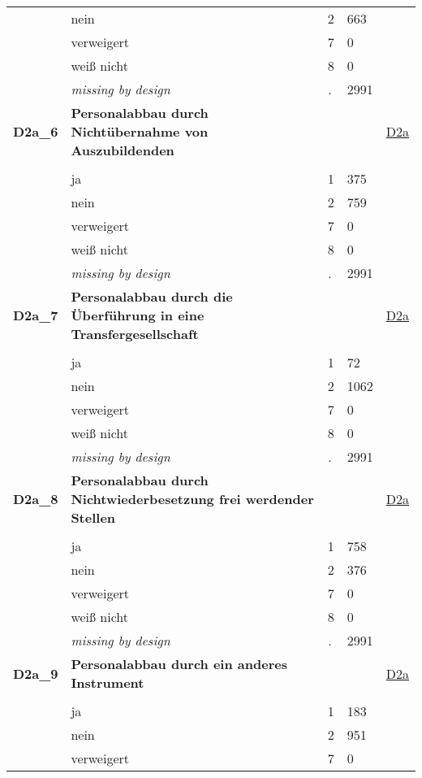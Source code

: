 \begin{longtable}{| L{2.65cm} | L{8cm} | C{1.5cm} | R{1.25cm} | C{2.25cm}  |}
   & nein & 2 & 663 &  \\ 
   & verweigert & 7 & 0 &  \\ 
   & weiß nicht & 8 & 0 &  \\ 
   & \textit{missing by design} & \textit{.} & 2991 &  \\ 
   \midrule
\textbf{D2a\_6}\label{var:D2a:6} & \textbf{Personalabbau durch Nichtübernahme von Auszubildenden} &  &  & \hyperref[D2a]{D2a} \\ 
   &  &  &  &  \\ 
   & ja & 1 & 375 &  \\ 
   & nein & 2 & 759 &  \\ 
   & verweigert & 7 & 0 &  \\ 
   & weiß nicht & 8 & 0 &  \\ 
   & \textit{missing by design} & \textit{.} & 2991 &  \\ 
   \midrule
\textbf{D2a\_7}\label{var:D2a:7} & \textbf{Personalabbau durch die Überführung in eine Transfergesellschaft} &  &  & \hyperref[D2a]{D2a} \\ 
   &  &  &  &  \\ 
   & ja & 1 & 72 &  \\ 
   & nein & 2 & 1062 &  \\ 
   & verweigert & 7 & 0 &  \\ 
   & weiß nicht & 8 & 0 &  \\ 
   & \textit{missing by design} & \textit{.} & 2991 &  \\ 
   \midrule
\textbf{D2a\_8}\label{var:D2a:8} & \textbf{Personalabbau durch Nichtwiederbesetzung frei werdender Stellen} &  &  & \hyperref[D2a]{D2a} \\ 
   &  &  &  &  \\ 
   & ja & 1 & 758 &  \\ 
   & nein & 2 & 376 &  \\ 
   & verweigert & 7 & 0 &  \\ 
   & weiß nicht & 8 & 0 &  \\ 
   & \textit{missing by design} & \textit{.} & 2991 &  \\ 
   \midrule
\textbf{D2a\_9}\label{var:D2a:9} & \textbf{Personalabbau durch ein anderes Instrument} &  &  & \hyperref[D2a]{D2a} \\ 
   &  &  &  &  \\ 
   & ja & 1 & 183 &  \\ 
   & nein & 2 & 951 &  \\ 
   & verweigert & 7 & 0 &  \\ 

\end{longtable}
